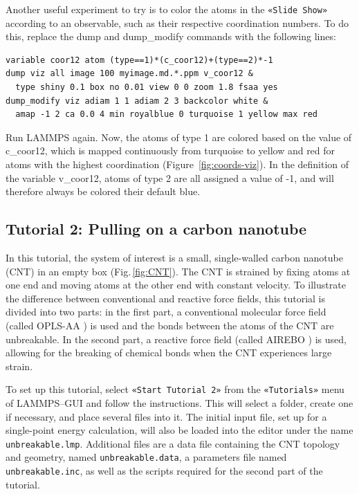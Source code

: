 \documentclass[9pt,tutorial]{livecoms}
\newcommand{\lmpcmd}[1]{\hspace{0pt}\colorbox{listing}{\textcolor{command}{\small{#1}}}\hspace{0pt}} %
\newcommand{\flecmd}[1]{\textcolor{command}{\texttt{#1}}} %
\newcommand{\guicmd}[1]{\textcolor{command}{\texttt{«#1»}}} %
\begin{document}
Another useful experiment to try is to color the atoms in the \guicmd{Slide Show}
according to an observable, such as their respective coordination
numbers.  To do this, replace the
\lmpcmd{dump} and \lmpcmd{dump\_modify} commands with the following lines:
\begin{lstlisting}
variable coor12 atom (type==1)*(c_coor12)+(type==2)*-1
dump viz all image 100 myimage.md.*.ppm v_coor12 &
  type shiny 0.1 box no 0.01 view 0 0 zoom 1.8 fsaa yes
dump_modify viz adiam 1 1 adiam 2 3 backcolor white &
  amap -1 2 ca 0.0 4 min royalblue 0 turquoise 1 yellow max red
\end{lstlisting}
Run LAMMPS again.  Now, the atoms of type 1 are colored based on the value
of \lmpcmd{c\_coor12}, which is mapped continuously from turquoise to yellow
and red for atoms with the highest coordination (Figure~\ref{fig:coords-viz}).
In the definition of the variable \lmpcmd{v\_coor12}, atoms of type 2 are
all assigned a value of -1, and will therefore always be colored their default blue.

\subsection{Tutorial 2: Pulling on a carbon nanotube}
\label{carbon-nanotube-label}

In this tutorial, the system of interest is a small, single-walled
carbon nanotube (CNT) in an empty box (Fig.\,\ref{fig:CNT}).  The CNT is
strained by fixing atoms at one end and moving atoms at the
other end with constant velocity.  To illustrate the difference between
conventional \cite{typelabel_paper} and reactive force fields, this
tutorial is divided into two parts: in the first part, a conventional molecular force
field (called OPLS-AA \cite{jorgensenDevelopmentTestingOPLS1996}) is
used and the bonds between the atoms of the CNT are unbreakable.  In the
second part, a reactive force field (called AIREBO
\cite{stuart2000reactive}) is used, allowing for the breaking of
chemical bonds when the CNT experiences large strain.

To set up this tutorial, select \guicmd{Start Tutorial 2} from the
\guicmd{Tutorials} menu of LAMMPS--GUI and follow the instructions.  This will
select a folder, create one if necessary, and place several files into it.
The initial input file, set up for a single-point energy
calculation, will also be loaded into the editor under the name
\flecmd{unbreakable.lmp}.  Additional files are a data file containing the
CNT topology and geometry, named \flecmd{unbreakable.data}, a parameters file
named \flecmd{unbreakable.inc}, as well as the scripts required for the second part
of the tutorial.
\end{document}
